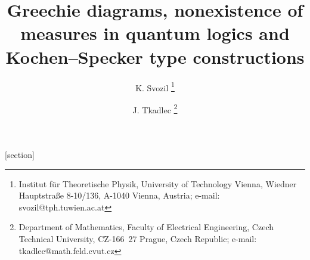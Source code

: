 [section]
\newenvironment{mytheorem}[1]%
{\begin{trivlist}
  \renewcommand{\theoftheorem}{#1~\arabic{section}.\arabic{oftheorem}}
  \refstepcounter{oftheorem}
  \item[\hspace{\labelsep}\bf\thesection.\arabic{oftheorem}.\,#1.]}%
{\end{trivlist}}

\newenvironment{definition}{\begin{mytheorem}{Definition}}{\end{mytheorem}}
\newenvironment{lemma}{\begin{mytheorem}{Lemma}\sl}{\end{mytheorem}}
\newenvironment{proposition}{\begin{mytheorem}{Proposition}\sl}{\end{mytheorem}}
\newenvironment{theorem}{\begin{mytheorem}{Theorem}\sl}{\end{mytheorem}}
\newenvironment{corollary}{\begin{mytheorem}{Corollary}\sl}{\end{mytheorem}}
\newenvironment{remark}{\begin{mytheorem}{Remark}}{\end{mytheorem}}
\newenvironment{problem}{\begin{mytheorem}{Problem}}{\end{mytheorem}}
\newenvironment{example}{\begin{mytheorem}{Example}}{\end{mytheorem}}
\newenvironment{question}{\begin{mytheorem}{Question}}{\end{mytheorem}}

\newenvironment{proof}%
  {\begin{trivlist}
  \item[\hspace{\labelsep}\bf Proof.]}%
  {\end{trivlist}}





\title {Greechie diagrams, nonexistence of measures in quantum logics and
Kochen--Specker type constructions}

\author {K. Svozil%
\thanks {Institut f\"ur Theoretische Physik, University of Technology
Vienna, Wiedner Hauptstra\ss{}e 8-10/136, A-1040 Vienna, Austria; e-mail:
svozil@tph.tuwien.ac.at}
\and
J. Tkadlec%
\thanks{Department of Mathematics, Faculty of Electrical Engineering,
Czech Technical University, CZ-166~27 Prague, Czech Republic;
e-mail: tkadlec@math.feld.cvut.cz}}

